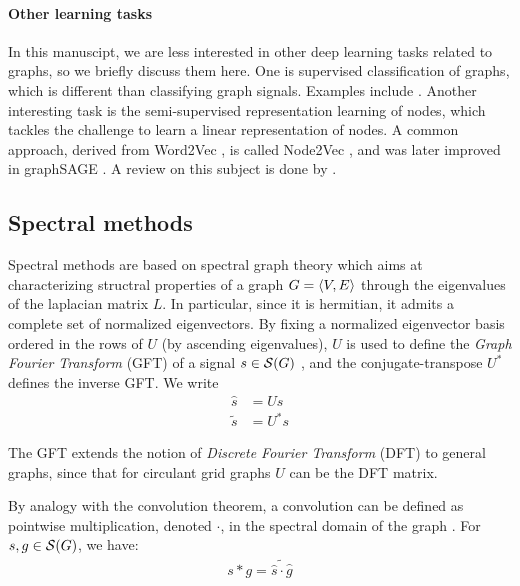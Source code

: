 \paragraph{Other learning tasks}
In this manuscipt, we are less interested in other deep learning tasks related to graphs, so we briefly discuss them here. One is supervised classification of graphs, which is different than classifying graph signals. Examples include \citep{niepert2016learning,tixier2017classifying}. Another interesting task is the semi-supervised representation learning of nodes, which tackles the challenge to learn a linear representation of nodes. A common approach, derived from Word2Vec \citep{mikolov2013efficient,mikolov2013distributed}, is called Node2Vec \citep{grover2016node2vec}, and was later improved in graphSAGE \citep{hamilton2017inductive}. A review on this subject is done by \cite{hamilton2017representation}.

\subsection{Spectral methods}
\label{sec:spec}

Spectral methods are based on spectral graph theory \citep{chung1996spectral} which aims at characterizing structral properties of a graph $G = \langle V, E \rangle$ through the eigenvalues of the laplacian matrix $L$. In particular, since it is hermitian, it admits a complete set of normalized eigenvectors. By fixing a normalized eigenvector basis ordered in the rows of $U$ (by ascending eigenvalues), $U$ is used to define the \emph{Graph Fourier Transform} (GFT) of a signal $s \in \mathcal{S}(G)$ \citep{shuman2013emerging}, and the conjugate-transpose $U^*$ defines the inverse GFT. We write
\begin{align}
\widehat{s} &= Us\\
\widetilde{s} &= U^*s
\end{align}

\begin{remark}
The GFT extends the notion of \emph{Discrete Fourier Transform} (DFT) to general graphs, since that for circulant grid graphs $U$ can be the DFT matrix.
\end{remark}

By analogy with the convolution theorem, a convolution can be defined as pointwise multiplication, denoted $\cdot$, in the spectral domain of the graph \citep{hammond2011wavelets}. For $s, g \in \mathcal{S}(G)$, we have:
\begin{gather}
s \ast g = \widetilde{\widehat{s} \cdot \widehat{g}} \label{eq:sc}
\end{gather}

